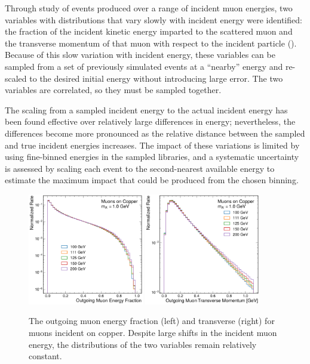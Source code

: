Through study of \mg events produced over a range of incident muon energies, two variables with distributions that vary slowly with incident energy were identified: the fraction of the incident kinetic energy imparted to the scattered muon and the transverse momentum of that muon with respect to the incident particle (). 
Because of this slow variation with incident energy, these variables can be sampled from a set of previously simulated \mg events at a ``nearby'' energy and re-scaled to the desired initial energy without introducing large error. 
The two variables are correlated, so they must be sampled together. 

The scaling from a sampled \mg incident energy to the actual \gf incident energy has been found effective over relatively large differences in energy; nevertheless, the differences become more pronounced as the relative distance between the sampled and true incident energies increases.
The impact of these variations is limited by using fine-binned energies in the sampled \mg libraries, and a systematic uncertainty is assessed by scaling each event to the second-nearest available energy to estimate the maximum impact that could be produced from the chosen binning. 

\begin{figure}[!htbp]
    \centering
    \includegraphics[width=0.45\textwidth]{figures/muon_energy_comp_efrac.pdf}
    \hspace{0.01\textwidth}
    \includegraphics[width=0.45\textwidth]{figures/muon_energy_comp_pt.pdf}
    \caption[
        Sampling variables used for \dbrem simulation.
    ]{
        The outgoing muon energy fraction (left) and transverse (right) for muons incident on copper. Despite large shifts in the incident muon energy, the distributions of the two variables remain relatively constant. 
    }
    \label{fig:efrac_pt}
\end{figure}

